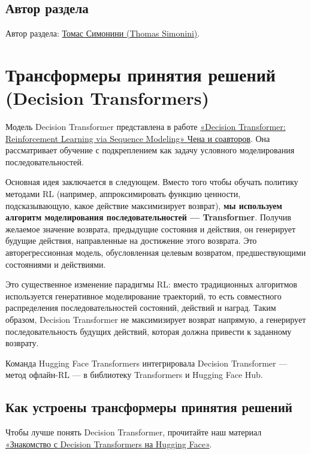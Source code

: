 \documentclass[11pt,a4paper]{article}
\begin{document}
\subsection{Автор раздела}\label{author-2}

Автор раздела: \href{https://twitter.com/ThomasSimonini}{Томас Симонини (Thomas Simonini)}.

\section{Трансформеры принятия решений (Decision Transformers)}\label{decision-transformers}

Модель Decision Transformer представлена в работе \href{https://arxiv.org/abs/2106.01345}{«Decision Transformer: Reinforcement Learning via Sequence Modeling» Чена и соавторов}. Она рассматривает обучение с подкреплением как задачу условного моделирования последовательностей.

Основная идея заключается в следующем. Вместо того чтобы обучать политику методами RL (например, аппроксимировать функцию ценности, подсказывающую, какое действие максимизирует возврат), \textbf{мы используем алгоритм моделирования последовательностей --- Transformer}. Получив желаемое значение возврата, предыдущие состояния и действия, он генерирует будущие действия, направленные на достижение этого возврата. Это авторегрессионная модель, обусловленная целевым возвратом, предшествующими состояниями и действиями.

Это существенное изменение парадигмы RL: вместо традиционных алгоритмов используется генеративное моделирование траекторий, то есть совместного распределения последовательностей состояний, действий и наград. Таким образом, Decision Transformer не максимизирует возврат напрямую, а генерирует последовательность будущих действий, которая должна привести к заданному возврату.

Команда Hugging Face Transformers интегрировала Decision Transformer --- метод офлайн-RL --- в библиотеку Transformers и Hugging Face Hub.

\subsection{Как устроены трансформеры принятия решений}\label{learn-about-decision-transformers}

Чтобы лучше понять Decision Transformer, прочитайте наш материал \href{https://huggingface.co/blog/decision-transformers}{«Знакомство с Decision Transformers на Hugging Face»}.
\end{document}
